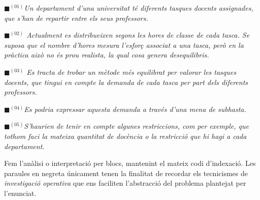 \documentclass[10pt,twocolumn]{article}
\begin{document}
\begin{tcolorbox}[colback=black!1,title=\textbf{Enunciat del problema},coltitle=black,colbacktitle=black!10]

\textit{{\color{cyan!60}$\blacksquare$}$^{(01)}${\color{black!80}Un departament d'una universitat té diferents tasques docents assignades, que s'han de repartir entre els seus professors.}}
 
\textit{{\color{blue!60}$\blacksquare$}$^{(02)}$ Actualment es distribueixen segons les hores de classe de cada tasca. Se suposa que el nombre d'hores mesura l'esforç associat a una tasca, però en la pràctica això no és prou realista, la qual cosa genera desequilibris.}

\textit{{\color{green!60}$\blacksquare$}$^{(03)}$ {\color{black!80}Es tracta de trobar un mètode més equilibrat per valorar les tasques docents, que tingui en compte la demanda de cada tasca per part dels diferents professors.}}
 
\textit{{\color{purple!60}$\blacksquare$}$^{(04)}$Es podria expressar aquesta demanda a través d'una mena de subhasta.}
 
\textit{{\color{violet!60}$\blacksquare$}$^{(05)}${\color{black!80}S'haurien de tenir en compte algunes restriccions, com per exemple, que tothom faci la mateixa quantitat de docència o la restricció que hi hagi a cada departament.}}

\end{tcolorbox}
Fem  l'anàlisi o interpretació per blocs, mantenint el mateix codi d'indexació. Les paraules en negreta únicament tenen la finalitat de recordar els tecnicismes de \textit{investigació operativa} que ens faciliten l'abstracció del problema plantejat per l'enunciat.
\end{document}
